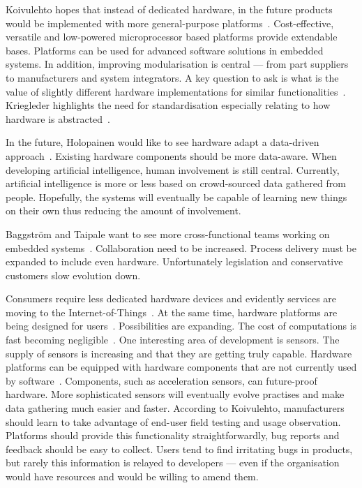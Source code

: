 \documentclass[english]{tktltiki2}
\begin{document}
Koivulehto hopes that instead of dedicated hardware, in the future products would be implemented with more general-purpose platforms~\cite{Koi15}. Cost-effective, versatile and low-powered microprocessor based platforms provide extendable bases. Platforms can be used for advanced software solutions in embedded systems. In addition, improving modularisation is central — from part suppliers to manufacturers and system integrators. A key question to ask is what is the value of slightly different hardware implementations for similar functionalities~\cite{Koi15}. Kriegleder highlights the need for standardisation especially relating to how hardware is abstracted~\cite{Kri15}.

In the future, Holopainen would like to see hardware adapt a data-driven approach~\cite{Hol15a}. Existing hardware components should be more data-aware. When developing artificial intelligence, human involvement is still central. Currently, artificial intelligence is more or less based on crowd-sourced data gathered from people. Hopefully, the systems will eventually be capable of learning new things on their own thus reducing the amount of involvement.

Baggström and Taipale want to see more cross-functional teams working on embedded systems~\cite{BT15}. Collaboration need to be increased. Process delivery must be expanded to include even hardware. Unfortunately legislation and conservative customers slow evolution down.

Consumers require less dedicated hardware devices and evidently services are moving to the Internet-of-Things~\cite{Koi15}. At the same time, hardware platforms are being designed for users~\cite{BT15}. Possibilities are expanding. The cost of computations is fast becoming negligible~\cite{Hol15a}. One interesting area of development is sensors. The supply of sensors is increasing and that they are getting truly capable. Hardware platforms can be equipped with hardware components that are not currently used by software~\cite{BT15}. Components, such as acceleration sensors, can future-proof hardware. More sophisticated sensors will eventually evolve practises and make data gathering much easier and faster. According to Koivulehto, manufacturers should learn to take advantage of end-user field testing and usage observation. Platforms should provide this functionality straightforwardly, bug reports and feedback should be easy to collect. Users tend to find irritating bugs in products, but rarely this information is relayed to developers — even if the organisation would have resources and would be willing to amend them.
\end{document}
